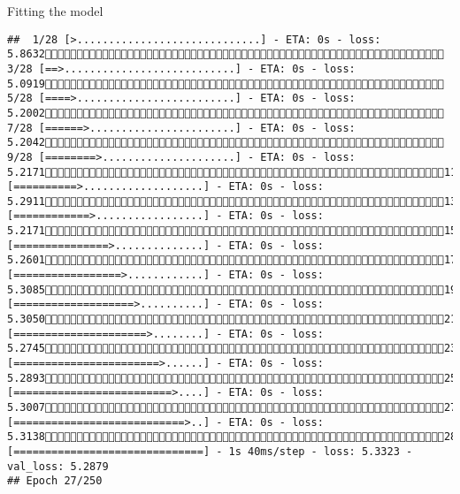 \documentclass[
  ignorenonframetext,
]{beamer}
\begin{document}
\begin{frame}[fragile]{Fitting the model}
\begin{verbatim}
##  1/28 [>.............................] - ETA: 0s - loss: 5.8632 3/28 [==>...........................] - ETA: 0s - loss: 5.0919 5/28 [====>.........................] - ETA: 0s - loss: 5.2002 7/28 [======>.......................] - ETA: 0s - loss: 5.2042 9/28 [========>.....................] - ETA: 0s - loss: 5.217111/28 [==========>...................] - ETA: 0s - loss: 5.291113/28 [============>.................] - ETA: 0s - loss: 5.217115/28 [===============>..............] - ETA: 0s - loss: 5.260117/28 [=================>............] - ETA: 0s - loss: 5.308519/28 [===================>..........] - ETA: 0s - loss: 5.305021/28 [=====================>........] - ETA: 0s - loss: 5.274523/28 [=======================>......] - ETA: 0s - loss: 5.289325/28 [=========================>....] - ETA: 0s - loss: 5.300727/28 [===========================>..] - ETA: 0s - loss: 5.313828/28 [==============================] - 1s 40ms/step - loss: 5.3323 - val_loss: 5.2879
## Epoch 27/250

\end{verbatim}
\end{frame}
\end{document}
